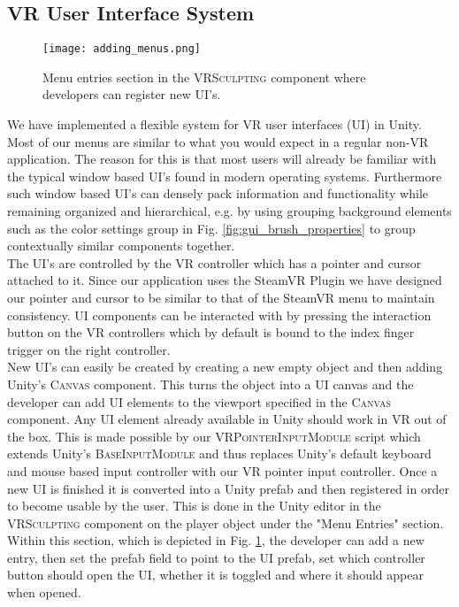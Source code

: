 \subsection{VR User Interface System}

\begin{figure}
\centering
\captionsetup{width=0.8\textwidth}
\texttt{[image: adding\_menus.png]}
\caption{Menu entries section in the \textsc{VRSculpting} component where developers can register new UI's.}
\label{fig:adding_menus}
\end{figure}

We have implemented a flexible system for VR user interfaces (UI) in Unity. Most of our menus are similar to what you would expect in a regular non-VR application. The reason for this is that most users will already be familiar with the typical window based UI's found in modern operating systems. Furthermore such window based UI's can densely pack information and functionality while remaining organized and hierarchical, e.g. by using grouping background elements such as the color settings group in Fig. \ref{fig:gui_brush_properties} to group contextually similar components together.\\
The UI's are controlled by the VR controller which has a pointer and cursor attached to it. Since our application uses the SteamVR Plugin we have designed our pointer and cursor to be similar to that of the SteamVR menu to maintain consistency. UI components can be interacted with by pressing the interaction button on the VR controllers which by default is bound to the index finger trigger on the right controller.\\
New UI's can easily be created by creating a new empty object and then adding Unity's \textsc{Canvas} component. This turns the object into a UI canvas and the developer can add UI elements to the viewport specified in the \textsc{Canvas} component. Any UI element already available in Unity should work in VR out of the box. This is made possible by our \textsc{VRPointerInputModule} script which extends Unity's \textsc{BaseInputModule} and thus replaces Unity's default keyboard and mouse based input controller with our VR pointer input controller. Once a new UI is finished it is converted into a Unity prefab and then registered in order to become usable by the user. This is done in the Unity editor in the \textsc{VRSculpting} component on the player object under the "Menu Entries" section. Within this section, which is depicted in Fig. \ref{fig:adding_menus}, the developer can add a new entry, then set the prefab field to point to the UI prefab, set which controller button should open the UI, whether it is toggled and where it should appear when opened.

